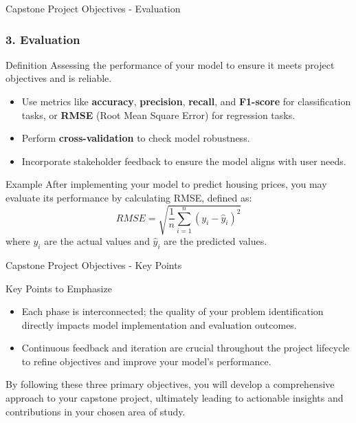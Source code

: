 \documentclass[aspectratio=169]{beamer}
\begin{document}
\begin{frame}[fragile]{Capstone Project Objectives - Evaluation}
    \frametitle{3. Evaluation}
    
    \begin{block}{Definition}
        Assessing the performance of your model to ensure it meets project objectives and is reliable.
    \end{block}

    \begin{itemize}
        \item Use metrics like \textbf{accuracy}, \textbf{precision}, \textbf{recall}, and \textbf{F1-score} for classification tasks, or \textbf{RMSE} (Root Mean Square Error) for regression tasks.
        \item Perform \textbf{cross-validation} to check model robustness.
        \item Incorporate stakeholder feedback to ensure the model aligns with user needs.
    \end{itemize}

    \begin{block}{Example}
        After implementing your model to predict housing prices, you may evaluate its performance by calculating RMSE, defined as:
        \begin{equation}
            RMSE = \sqrt{\frac{1}{n} \sum_{i=1}^{n} (y_i - \hat{y}_i)^2}
        \end{equation}
        where \(y_i\) are the actual values and \(\hat{y}_i\) are the predicted values.
    \end{block}
\end{frame}

\begin{frame}[fragile]{Capstone Project Objectives - Key Points}
    \begin{block}{Key Points to Emphasize}
        \begin{itemize}
            \item Each phase is interconnected; the quality of your problem identification directly impacts model implementation and evaluation outcomes.
            \item Continuous feedback and iteration are crucial throughout the project lifecycle to refine objectives and improve your model's performance.
        \end{itemize}
    \end{block}
    
    By following these three primary objectives, you will develop a comprehensive approach to your capstone project, ultimately leading to actionable insights and contributions in your chosen area of study.
\end{frame}
\end{document}
